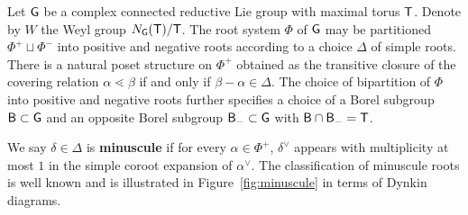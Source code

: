 \documentclass[12pt]{amsart}
\theoremstyle{definition}
\theoremstyle{remark}
\numberwithin{equation}{section}
\begin{document}
Let ${\sf G}$ be a complex connected reductive Lie group with maximal torus ${\sf T}$. Denote by $W$ the Weyl group $N_{\sf G}({\sf T})/{\sf T}$. The root system $\Phi$ of ${\sf G}$ may be partitioned $\Phi^+ \sqcup \Phi^-$ into positive and negative roots according to a choice $\Delta$ of simple roots. There is a natural poset structure on $\Phi^+$ obtained as the transitive closure of the covering relation $\alpha \lessdot \beta$ if and only if $\beta - \alpha \in \Delta$. The choice of bipartition of $\Phi$ into positive and negative roots further specifies a choice of a Borel subgroup ${\sf B} \subset {\sf G}$ and an opposite Borel subgroup ${\sf B}_- \subset {\sf G}$ with ${\sf B} \cap {\sf B}_- = {\sf T}$.

We say $\delta \in \Delta$ is {\bf minuscule} if for every $\alpha \in \Phi^+$, $\delta^\vee$ appears with multiplicity at most $1$ in the simple coroot expansion of $\alpha^\vee$. The classification of minuscule roots is well known and is illustrated in Figure~\ref{fig:minuscule} in terms of Dynkin diagrams.
\end{document}
